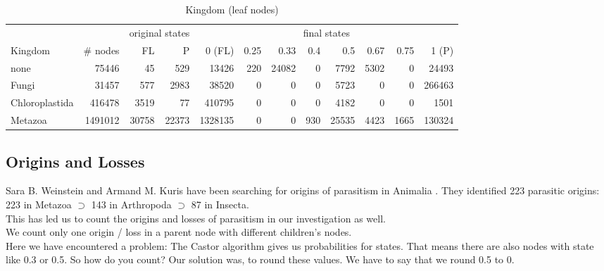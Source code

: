       \begin{table}
        \begin{center}
          \hspace*{-2cm}\begin{tabular}{ |l|r||r|r||r|r|r|r|r|r|r|r| }
            \hline
            & & \multicolumn{2}{c||}{original states} & \multicolumn{8}{c|}{final states} \\
            Kingdom & \# nodes & FL & P
              & 0 (FL) & 0.25 & 0.33 & 0.4 & 0.5 & 0.67 & 0.75 & 1 (P) \\
            \hline \hline
            none & 75446 & 45 & 529 
              & 13426 & 220 & 24082 & 0 & 7792 & 5302 & 0 & 24493 \\
            Fungi & 31457 & 577 & 2983
              & 38520 & 0 & 0 & 0 & 5723 & 0 & 0 & 266463 \\
            Chloroplastida & 416478 & 3519 & 77
              & 410795 & 0 & 0 & 0 & 4182 & 0 & 0 & 1501 \\
            Metazoa & 1491012 & 30758 & 22373
              & 1328135 & 0 & 0 & 930 & 25535 & 4423 & 1665 & 130324 \\
            \hline  
          \end{tabular}
        \end{center}
        \caption{Kingdom (leaf nodes)}
      \end{table}

\newpage
    \subsection{Origins and Losses}

      Sara B. Weinstein and Armand M. Kuris have been searching for origins of parasitism in Animalia 
        \cite{Weinstein2016}. They identified 223 parasitic origins: 223 in Metazoa $\supset$ 143 in 
        Arthropoda $\supset$ 87 in Insecta. \\
      This has led us to count the origins and losses of parasitism in our investigation as well. \\
      We count only one origin / loss in a parent node with different children's nodes. \\
      Here we have encountered a problem: The Castor algorithm gives us probabilities for states. That 
        means there are also nodes with state like 0.3 or 0.5. So how do you count? Our solution was, 
        to round these values. We have to say that we round 0.5 to 0.

